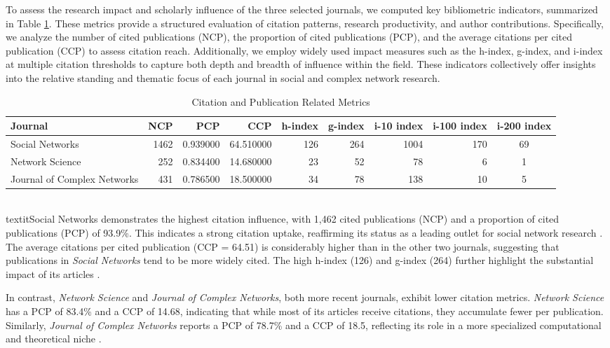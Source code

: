 \documentclass[twocolumn]{article}
\begin{document}
	To assess the research impact and scholarly influence of the three selected journals, we computed key bibliometric indicators, summarized in Table \ref{table.tab3}. These metrics provide a structured evaluation of citation patterns, research productivity, and author contributions. Specifically, we analyze the number of cited publications (NCP), the proportion of cited publications (PCP), and the average citations per cited publication (CCP) to assess citation reach. Additionally, we employ widely used impact measures such as the h-index, g-index, and i-index at multiple citation thresholds to capture both depth and breadth of influence within the field. These indicators collectively offer insights into the relative standing and thematic focus of each journal in social and complex network research.
	\begin{table}[htbp]
		\tiny
		\caption{Citation and Publication Related Metrics}\label{table.tab3}
		\begin{tabularx}{\textwidth}{l|r|r|r|r|r|r|r|c}
			\toprule
			Journal & NCP & PCP & CCP & h-index & g-index & i-10 index & i-100 index & i-200 index \\
			\midrule
			Social Networks & 1462 & 0.939000 & 64.510000 & 126 & 264 & 1004 & 170 & 69 \\
			Network Science & 252 & 0.834400 & 14.680000 & 23 & 52 & 78 & 6 & 1 \\
			Journal of Complex Networks & 431 & 0.786500 & 18.500000 & 34 & 78 & 138 & 10 & 5 \\
			\bottomrule
		\end{tabularx}
	\end{table}
	\\textit{Social Networks} demonstrates the highest citation influence, with 1,462 cited publications (NCP) and a proportion of cited publications (PCP) of 93.9\%. This indicates a strong citation uptake, reaffirming its status as a leading outlet for social network research \cite{Freeman2004, Borgatti2009}. The average citations per cited publication (CCP = 64.51) is considerably higher than in the other two journals, suggesting that publications in \textit{Social Networks} tend to be more widely cited. The high h-index (126) and g-index (264) further highlight the substantial impact of its articles \cite{Moody2004}.
	
	In contrast, \textit{Network Science} and \textit{Journal of Complex Networks}, both more recent journals, exhibit lower citation metrics. \textit{Network Science} has a PCP of 83.4\% and a CCP of 14.68, indicating that while most of its articles receive citations, they accumulate fewer per publication. Similarly, \textit{Journal of Complex Networks} reports a PCP of 78.7\% and a CCP of 18.5, reflecting its role in a more specialized computational and theoretical niche \cite{Newman2010, Barabasi2016}.
	
\end{document}
